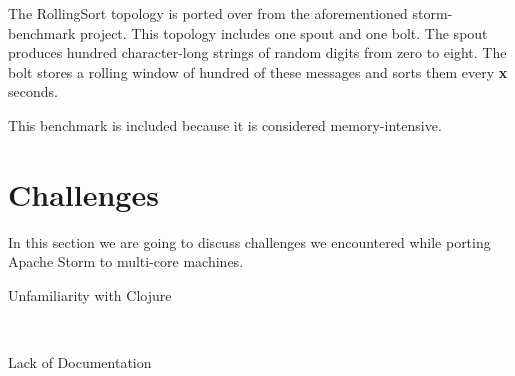 The RollingSort topology is ported over from the aforementioned storm-benchmark project. This topology includes one spout and one bolt. The spout produces hundred character-long strings of random digits from zero to eight. The bolt stores a rolling window of hundred of these messages and sorts them every \textbf{x} seconds.

This benchmark is included because it is considered memory-intensive.


\section{Challenges}
\label{sec:challenges}

In this section we are going to discuss challenges we encountered while porting Apache Storm to multi-core machines.

\begin{description}
	\item[Unfamiliarity with Clojure] \hfill \\
	
	\item[Lack of Documentation] \hfill \\
	
\end{description}

